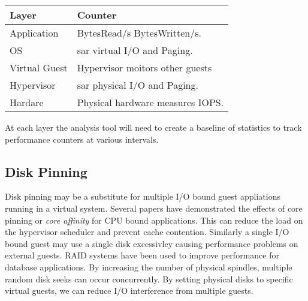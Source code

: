 \begin{tabular}{ l p{5cm} }
  Layer & Counter \\
  \hline
  Application & BytesRead/s BytesWritten/s. \\
  OS & sar virtual I/O and Paging. \\
  Virtual Guest & Hypervisor moitors other guests \\
  Hypervisor & sar physical I/O and Paging. \\
  Hardare & Physical hardware measures IOPS. \\
\end{tabular}

\indent At each layer the analysis tool will need to create a baseline of statistics to track performance counters at various intervals.

\subsection{Disk Pinning}
Disk pinning may be a substitute for multiple I/O bound guest appliations running in a virtual system.  Several papers have demonstrated the effects of core pinning or \emph{core affinity} for CPU bound applications.  This can reduce the load on the hypervisor scheduler and prevent cache contention.  Similarly a single I/O bound guest may use a single disk excessivley causing performance problems on external guests.  RAID systems have been used to improve performance for database applications.  By increasing the number of physical spindles, multiple random disk seeks can occur concurrently.  By setting physical disks to specific virtual guests, we can reduce I/O interference from multiple guests.
